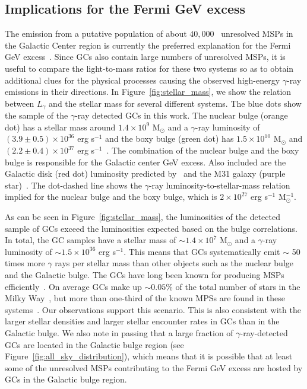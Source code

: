 \documentclass[doublespace,draft,nopageskip]{VTthesis} %
\begin{document}
\subsection{Implications for the Fermi GeV excess}

The emission from a putative population of about $40,000$~\citep{2020JCAP...12..035P} unresolved MSPs in the Galactic Center region is currently the preferred explanation for the Fermi GeV excess~\citep{2018NatAs...2..387M,2018NatAs...2..819B,2019JCAP...09..042M,2020PhRvD.102d3012A}. Since GCs also contain large numbers of unresolved MSPs, it is useful to compare the light-to-mass ratios for these two systems so as to obtain additional clues for the physical processes causing the observed high-energy $\gamma$-ray emissions in their directions. In Figure~\ref{fig:stellar_mass}, we show the relation between $L_\gamma$ and the stellar mass for several different systems. The blue dots show the sample of the $\gamma$-ray detected GCs in this work. The nuclear bulge (orange dot) has a stellar mass around $1.4\times 10^9$ M$_\odot$ and a $\gamma$-ray luminosity of $(3.9\pm 0.5)\times 10^{36}$ erg s$^{-1}$ and the boxy bulge (green dot) has $1.5\times 10^{10}$ M$_\odot$ and $(2.2 \pm 0.4)\times 10^{37}$ erg s$^{-1}$~\citep{2019JCAP...09..042M}. The combination of the nuclear bulge and the boxy bulge is responsible for the Galactic center GeV excess. Also included are the Galactic disk (red dot) luminosity predicted by~\citet{2018NatAs...2..819B} and the M31 galaxy (purple star)~\citep{2017ApJ...836..208A}. The dot-dashed line shows the $\gamma$-ray luminosity-to-stellar-mass relation implied for the nuclear bulge and the boxy bulge, which is $2 \times 10^{27}$ erg s$^{-1}$ M$_\odot^{-1}$. 

As can be seen in Figure~\ref{fig:stellar_mass}, the luminosities of the detected sample of GCs exceed the luminosities expected based on the bulge correlations. In total, the GC samples have a stellar mass of $\sim 1.4\times 10^7$ M$_\odot$ and a $\gamma$-ray luminosity of $\sim 1.5\times 10^{36}$ erg s$^{-1}$. This means that GCs systematically emit $\sim$ 50 times more $\gamma$ rays per stellar mass than other objects such as the nuclear bulge and the Galactic bulge. The GCs have long been known for producing MSPs efficiently~\citep{2005ASPC..328..147C}. On average GCs make up $\sim 0.05\%$ of the total number of stars in the Milky Way~\citep{2019ApJ...877..122Y}, but more than one-third of the known MPSs are found in these systems~\citep{2005AJ....129.1993M}. Our observations support this scenario. This is also consistent with the larger stellar densities and larger stellar encounter rates in GCs than in the Galactic bulge. We also note in passing that a large fraction of $\gamma$-ray-detected GCs are located in the Galactic bulge region (see Figure~\ref{fig:all_sky_distribution}), which means that it is possible that at least some of the unresolved MSPs contributing to the Fermi GeV excess are hosted by GCs in the Galactic bulge region.
\end{document}
